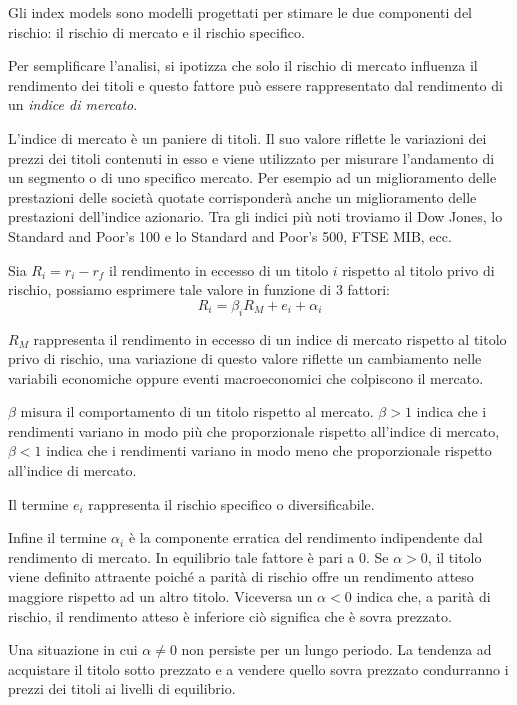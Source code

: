 Gli index models sono modelli progettati per stimare le due componenti del rischio: il rischio di mercato e il rischio specifico. 

Per semplificare l'analisi, si ipotizza che solo il rischio di mercato influenza il rendimento dei titoli e questo fattore può essere rappresentato dal rendimento di un \textit{indice di mercato}.


L'indice di mercato è un paniere di titoli. Il suo valore riflette le variazioni dei prezzi dei titoli contenuti in esso e viene utilizzato per misurare l'andamento di un segmento o di uno specifico mercato. Per esempio ad un miglioramento delle prestazioni delle società quotate corrisponderà anche un miglioramento delle prestazioni dell'indice azionario.
Tra gli indici più noti troviamo il Dow Jones, lo Standard and Poor's 100 e lo Standard and Poor's 500, FTSE MIB, ecc. 

Sia $R_{i}=r_{i}-r_{f}$ il rendimento in eccesso di un titolo $i$ rispetto al titolo privo di rischio, possiamo esprimere tale valore in funzione di 3 fattori: 
\begin{equation}
R_{i}=\beta_{i}R_{M}+e_{i}+ \alpha_{i}
\end{equation}

$R_{M}$ rappresenta il rendimento in eccesso di un indice di mercato rispetto al titolo privo di rischio, una variazione di questo valore riflette un cambiamento nelle variabili economiche oppure eventi macroeconomici che colpiscono il mercato.  

$\beta$ misura il comportamento di un titolo rispetto al mercato. $\beta> 1$ indica che i rendimenti variano in modo più che proporzionale rispetto all'indice di mercato, $\beta<1$ indica che i rendimenti variano in modo meno che proporzionale rispetto all'indice di mercato. 

Il termine $e_{i}$ rappresenta il rischio specifico o diversificabile. 

Infine il termine $\alpha_{i}$ è la componente erratica del rendimento indipendente dal rendimento di mercato. In equilibrio tale fattore è pari a 0. Se $\alpha>0$, il titolo viene definito attraente poiché a parità di rischio offre un rendimento atteso maggiore rispetto ad un altro titolo. Viceversa un $\alpha<0$ indica che, a parità di rischio, il rendimento atteso è inferiore ciò significa che è sovra prezzato. 

Una situazione in cui  $\alpha\neq0$ non persiste per un lungo periodo. La tendenza ad acquistare il titolo sotto prezzato e a vendere quello sovra prezzato condurranno i prezzi dei titoli ai livelli di equilibrio. 

